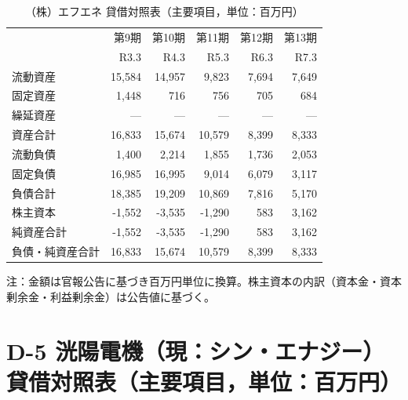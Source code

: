 \begin{table}[H]
\centering
\caption{（株）エフエネ 貸借対照表（主要項目，単位：百万円）}
\begin{tabular}{lrrrrr}
\toprule
 & 第9期 & 第10期 & 第11期 & 第12期 & 第13期 \\
 & R3.3 & R4.3 & R5.3 & R6.3 & R7.3 \\
\midrule
流動資産       & 15{,}584 & 14{,}957 & 9{,}823 & 7{,}694 & 7{,}649 \\
固定資産       & 1{,}448  & 716      & 756     & 705     & 684 \\
繰延資産       & —        & —        & —       & —       & — \\
\midrule
資産合計       & 16{,}833 & 15{,}674 & 10{,}579 & 8{,}399 & 8{,}333 \\
\midrule
流動負債       & 1{,}400  & 2{,}214  & 1{,}855  & 1{,}736 & 2{,}053 \\
固定負債       & 16{,}985 & 16{,}995 & 9{,}014  & 6{,}079 & 3{,}117 \\
負債合計       & 18{,}385 & 19{,}209 & 10{,}869 & 7{,}816 & 5{,}170 \\
\midrule
株主資本       & -1{,}552 & -3{,}535 & -1{,}290 & 583     & 3{,}162 \\
純資産合計     & -1{,}552 & -3{,}535 & -1{,}290 & 583     & 3{,}162 \\
\midrule
負債・純資産合計 & 16{,}833 & 15{,}674 & 10{,}579 & 8{,}399 & 8{,}333 \\
\bottomrule
\end{tabular}
\end{table}

\begin{flushleft}
\footnotesize
注：金額は官報公告に基づき百万円単位に換算。株主資本の内訳（資本金・資本剰余金・利益剰余金）は公告値に基づく。
\end{flushleft}

\section*{D-5 洸陽電機（現：シン・エナジー）貸借対照表（主要項目，単位：百万円）}

